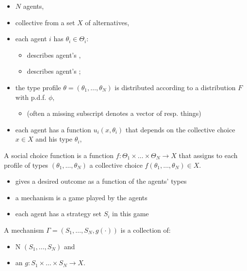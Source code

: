 \documentclass[english,handout,10pt]{beamer}		%
\def\lyxframeend{} %
\begin{document}
\begin{itemize}
	\item $N$ agents,
	\item collective  from a set $X$ of alternatives,
	\item each agent $i$ has  $\theta_i\in\Theta_{i}$:
	\begin{itemize}
		\item describes agent's ,
		\item describes agent's ;
	\end{itemize}
	\item the type profile $\theta=(\theta_1,\dots,\theta_{N})$ is distributed according to a distribution $F$ with p.d.f. $\phi$,
	\begin{itemize}
		\item (often a missing subscript denotes a vector of resp. things)
	\end{itemize}
	\item each agent has a  function $u_{i}(x,\theta_{i})$ that depends on the collective choice $x \in X$ and his type $\theta_i$,
\end{itemize}
\lyxframeend


\begin{definition}
	A \alert{social choice function} is a function $f:\Theta_{1}\times \dots\times\Theta_{N}\rightarrow X$ that assigns to each profile of types $(\theta_{1},\dots,\theta_{N})$ a collective choice $f(\theta_{1},\dots,\theta_{N})\in X$.
\end{definition}
\begin{itemize}
	\item gives a desired outcome as a function of the agents' types
\end{itemize}
\lyxframeend


\begin{itemize}
	\item a mechanism is a game played by the agents
	\item each agent has a strategy set $S_{i}$ in this game
\end{itemize}
\begin{definition}[mechanism]
	A \alert{mechanism} $\Gamma=(S_{1},\dots,S_{N},g(\cdot))$ is a collection of: 
	\begin{itemize}
		\item N  $(S_{1},\dots,S_{N})$ and 
		\item an  $g:S_{1}\times\dots\times S_{N}\rightarrow X$.
	\end{itemize}
\end{definition}
\lyxframeend
\end{document}
